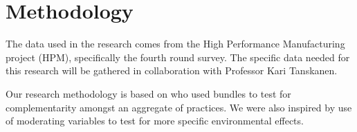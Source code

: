 \section{Methodology}
The data used in the research comes from the High Performance Manufacturing project (HPM), specifically the fourth round survey. The specific data needed for this research will be gathered in collaboration with Professor Kari Tanskanen.


Our research methodology is based on \cite{furlanComplementarityLeanManufacturing2011} who used bundles to test for complementarity amongst an aggregate of practices. 
We were also inspired by \cite{maoLowCarbonSupply2017} use of moderating variables to test for more specific environmental effects. 
